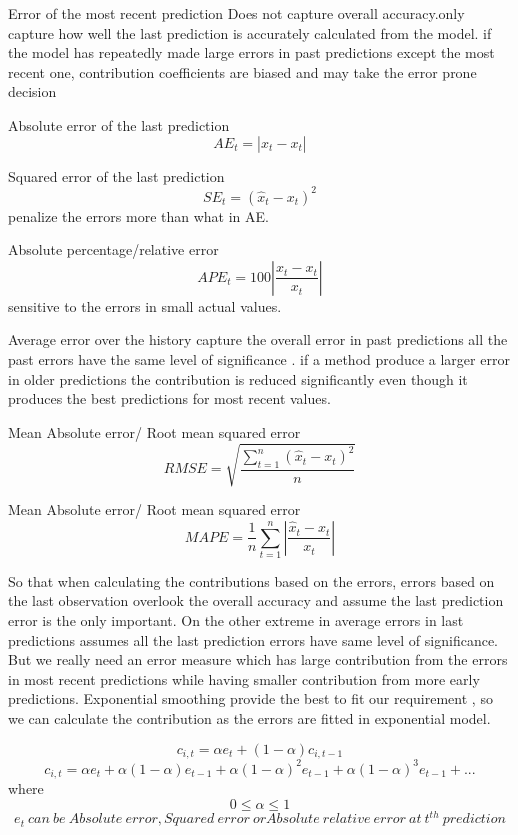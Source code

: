 Error of the most recent prediction
Does not capture overall accuracy.only capture how well the last prediction is accurately calculated from the model. if the model has repeatedly made large errors in past predictions except the most recent one, contribution coefficients are biased and may take the error prone decision

Absolute error of the last prediction
$$AE_t=|\hat{x}_t-x_t|$$

Squared error of the last prediction
$$SE_t=(\hat{x}_t-x_t)^2$$
penalize the errors more than what in AE.

Absolute percentage/relative error
$$APE_t=100\left |\frac{\hat{x}_t-x_t}{x_t}  \right |$$
sensitive to the errors in small actual values. 
		
Average error over the history
capture the overall error in past predictions all the past errors have the same level of significance . if a method produce a larger error in older predictions  the contribution is reduced significantly even though it produces the best predictions for most recent values.

Mean Absolute error/ Root mean squared error
$$RMSE=\sqrt{\frac{\sum_{t=1}^{n}(\hat{x}_{t}-x_{t})^{2}}{n}}$$ 

Mean Absolute error/ Root mean squared error
$$ MAPE=\frac{1}{n}\sum_{t=1}^{n}\left | \frac{\hat{x}_{t}-x_{t}}{x_{t}} \right |$$

So that when calculating the contributions based on the errors, errors based on the last observation overlook the overall accuracy and assume the last prediction error is the only important. On the other extreme in average errors in last predictions assumes all the last prediction errors have same level of significance. But we really need an error measure which has large contribution from the errors in most recent predictions while having smaller contribution from more early predictions. Exponential smoothing provide the best to fit our requirement , so we can calculate the contribution as the errors are fitted in exponential model.

$$c_{i,t}= \alpha e_t + (1-\alpha)c_{i,t-1}$$
$$c_{i,t}=\alpha e_t + \alpha(1-\alpha)e_{t-1}+\alpha(1-\alpha)^2e_{t-1}+\alpha(1-\alpha)^3e_{t-1}+ . ..$$
where $$0\leq \alpha \leq 1$$	$$ e_{t} \ can \ be \ Absolute \ error , Squared \ error \ or Absolute \ relative \ error \ at \ t^{th} \ prediction $$

